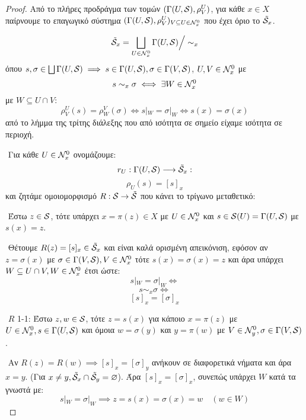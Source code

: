 \begin{proof}
    Από το πλήρες προδράγμα των τομών $(\Gamma(U,\mathcal{S}),\rho^U_V)$, για κάθε $x \in X$ παίρνουμε το επαγωγικό σύστημα $(\Gamma(U,\mathcal{S}),\rho^U_V)_{V\subseteq U \in \mathcal{N}^0_x}$ που έχει όριο το $\tilde{\mathcal{S}}_x$. 
    
    $$\tilde{\mathcal{S}}_x = \bigsqcup\limits_{U\in\mathcal{N}^0_x}\Gamma(U,\mathcal{S}) \Big/ \sim_x$$ όπου $s,\sigma \in \bigsqcup \Gamma(U,\mathcal{S}) \implies s\in \Gamma(U,\mathcal{S}), \sigma \in \Gamma(V,\mathcal{S})$, $U,V \in \mathcal{N}^0_x$ με 
    $$s \sim_x \sigma \iff \exists W \in \mathcal{N}^0_x$$ με $W\subseteq U\cap V:$
    $$\rho^U_V (s) = \rho^V_W (\sigma) \iff s|_W = \sigma |_W \iff s(x) = \sigma(x) $$ από το λήμμα της τρίτης διάλεξης που από ισότητα σε σημείο είχαμε ισότητα σε περιοχή.

    $ $\newline
    Για κάθε $U \in \mathcal{N}^0_x$ ονομάζουμε:
    $$r_U: \Gamma(U,\mathcal{S}) \longrightarrow \tilde{\mathcal{S}}_x:$$
    $$\rho_U (s) = [s]_x$$ και ζητάμε ομοιομορφισμό $R:\mathcal{S} \rightarrow \tilde{\mathcal{S}}$ που κάνει το τρίγωνο μεταθετικό:

    \begin{figure}[H]
        \centering
    \end{figure}

    $ $\newline
    Έστω $z \in \mathcal{S}$, τότε υπάρχει $x = \pi(z) \in X$ με $ U \in \mathcal{N}^0_x$ και $s \in \mathcal{S}(U) = \Gamma(U,\mathcal{S})$ με $s(x) = z$.

    $ $\newline
    Θέτουμε $R(z) = [s]_x \in \tilde{\mathcal{S}}_x$ και είναι καλά ορισμένη απεικόνιση, εφόσον αν $z = \sigma(x)$ με  $ \sigma \in \Gamma(V,\mathcal{S}), V\in\mathcal{N}^0_x$ τότε $s(x) = \sigma(x) = z $ και άρα υπάρχει $W \subseteq U\cap V, W \in \mathcal{N}^0_x$ έτσι ώστε:
    $$s|_W = \sigma|_W \iff $$
    $$ s \sim_x \sigma \iff $$
    $$[s]_x = [\sigma]_x$$

    $ $\newline
    $R$ 1-1: Έστω $z,w \in \mathcal{S}$, τότε $z = s(x)$ για κάποιο $x = \pi(z)$ με $ U \in \mathcal{N}^0_x, s \in \Gamma(U,\mathcal{S})$ και όμοια $w=\sigma(y)$ και $ y=\pi(w)$ με $ V \in \mathcal{N}^0_y, \sigma \in \Gamma(V,\mathcal{S})$.

    $ $\newline
    Αν $R(z) = R(w) \implies [s]_x = [\sigma]_y$ ανήκουν σε διαφορετικά νήματα και άρα $x=y$. (Για $x\neq y, \tilde{\mathcal{S}}_x \cap \tilde{\mathcal{S}}_y = \varnothing$). Άρα $[s]_x = [\sigma]_x$, συνεπώς υπάρχει $W$ κατά τα γνωστά με:
    $$s|_W = \sigma|_W \implies z = s(x) = \sigma(x) = w  \quad (w \in W)$$



\end{proof}
